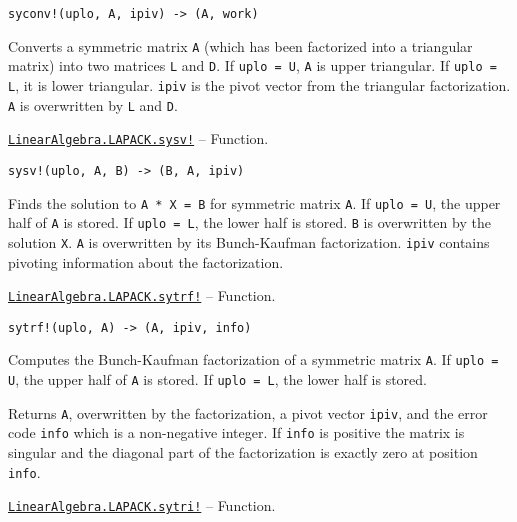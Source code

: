\begin{adjustwidth}{2em}{0pt}


\begin{verbatim}
syconv!(uplo, A, ipiv) -> (A, work)
\end{verbatim}

Converts a symmetric matrix \texttt{A} (which has been factorized into a triangular matrix) into two matrices \texttt{L} and \texttt{D}. If \texttt{uplo = U}, \texttt{A} is upper triangular. If \texttt{uplo = L}, it is lower triangular. \texttt{ipiv} is the pivot vector from the triangular factorization. \texttt{A} is overwritten by \texttt{L} and \texttt{D}.



\end{adjustwidth}
\hypertarget{9619199705618830828}{} 
\hyperlink{9619199705618830828}{\texttt{LinearAlgebra.LAPACK.sysv!}}  -- {Function.}

\begin{adjustwidth}{2em}{0pt}


\begin{verbatim}
sysv!(uplo, A, B) -> (B, A, ipiv)
\end{verbatim}

Finds the solution to \texttt{A * X = B} for symmetric matrix \texttt{A}. If \texttt{uplo = U}, the upper half of \texttt{A} is stored. If \texttt{uplo = L}, the lower half is stored. \texttt{B} is overwritten by the solution \texttt{X}. \texttt{A} is overwritten by its Bunch-Kaufman factorization. \texttt{ipiv} contains pivoting information about the factorization.



\end{adjustwidth}
\hypertarget{4323538288339311968}{} 
\hyperlink{4323538288339311968}{\texttt{LinearAlgebra.LAPACK.sytrf!}}  -- {Function.}

\begin{adjustwidth}{2em}{0pt}


\begin{verbatim}
sytrf!(uplo, A) -> (A, ipiv, info)
\end{verbatim}

Computes the Bunch-Kaufman factorization of a symmetric matrix \texttt{A}. If \texttt{uplo = U}, the upper half of \texttt{A} is stored. If \texttt{uplo = L}, the lower half is stored.

Returns \texttt{A}, overwritten by the factorization, a pivot vector \texttt{ipiv}, and the error code \texttt{info} which is a non-negative integer. If \texttt{info} is positive the matrix is singular and the diagonal part of the factorization is exactly zero at position \texttt{info}.



\end{adjustwidth}
\hypertarget{16079738955302816092}{} 
\hyperlink{16079738955302816092}{\texttt{LinearAlgebra.LAPACK.sytri!}}  -- {Function.}

